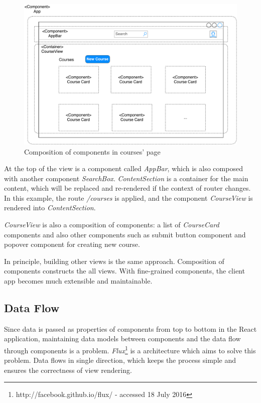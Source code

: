 \begin{figure}[!htbp]
  \centering
    \includegraphics[width=1\textwidth]{Figures/imp-course-view-composition.pdf}
  \caption{Composition of components in courses' page}
  \label{fig:course-view-composition-imp}
\end{figure}

At the top of the view is a component called \textit{AppBar}, which is also composed with another component \textit{SearchBox}. \textit{ContentSection} is a container for the main content, which will be replaced and re-rendered if the context of router changes. In this example, the route \textit{/courses} is applied, and the component \textit{CourseView} is rendered into \textit{ContentSection}. 

\textit{CourseView} is also a composition of components: a list of \textit{CourseCard} components and also other components such as submit button component and popover component for creating new course. 

In principle, building other views is the same approach. Composition of components constructs the all views. With fine-grained components, the client app becomes much extensible and maintainable.


\subsection{Data Flow}\label{subsection:data-flow-react-imp}

Since data is passed as properties of components from top to bottom in the React application, maintaining data models between components and the data flow through components is a problem. \textit{Flux}\footnote{http://facebook.github.io/flux/ - accessed 18 July 2016} is a architecture which aims to solve this problem. Data flows in single direction, which keeps the process simple and ensures the correctness of view rendering.

